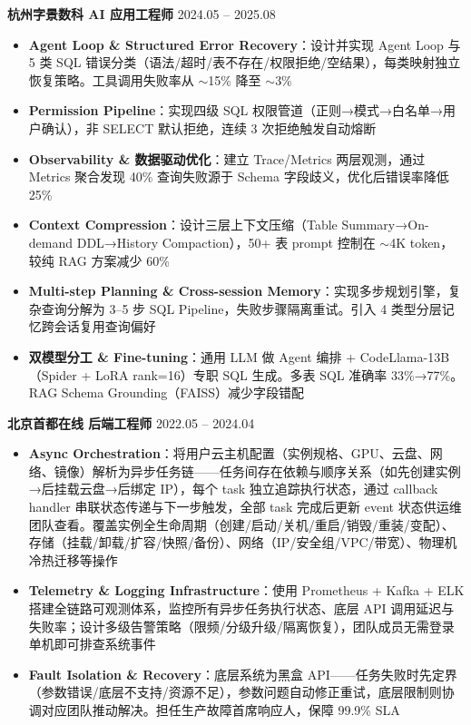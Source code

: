 \documentclass[10pt, a4paper]{article}
\newcommand{\entry}[2]{
  \vspace{0.35em}
  \noindent\textbf{#1} \hfill {\color{lightgray}\small #2}\newline
}
\begin{document}
\entry{杭州字景数科 \textbar{} AI 应用工程师}{2024.05 -- 2025.08}
\begin{itemize}
  \item \textbf{Agent Loop \& Structured Error Recovery}：设计并实现 Agent Loop 与 5 类 SQL 错误分类（语法/超时/表不存在/权限拒绝/空结果），每类映射独立恢复策略。工具调用失败率从 $\sim$15\% 降至 $\sim$3\%

  \item \textbf{Permission Pipeline}：实现四级 SQL 权限管道（正则→模式→白名单→用户确认），非 SELECT 默认拒绝，连续 3 次拒绝触发自动熔断

  \item \textbf{Observability \& 数据驱动优化}：建立 Trace/Metrics 两层观测，通过 Metrics 聚合发现 40\% 查询失败源于 Schema 字段歧义，优化后错误率降低 25\%

  \item \textbf{Context Compression}：设计三层上下文压缩（Table Summary→On-demand DDL→History Compaction），50+ 表 prompt 控制在 $\sim$4K token，较纯 RAG 方案减少 60\%

  \item \textbf{Multi-step Planning \& Cross-session Memory}：实现多步规划引擎，复杂查询分解为 3--5 步 SQL Pipeline，失败步骤隔离重试。引入 4 类型分层记忆跨会话复用查询偏好

  \item \textbf{双模型分工 \& Fine-tuning}：通用 LLM 做 Agent 编排 + CodeLlama-13B（Spider + LoRA rank=16）专职 SQL 生成。多表 SQL 准确率 33\%→77\%。RAG Schema Grounding（FAISS）减少字段错配
\end{itemize}

\entry{北京首都在线 \textbar{} 后端工程师}{2022.05 -- 2024.04}
\begin{itemize}
  \item \textbf{Async Orchestration}：将用户云主机配置（实例规格、GPU、云盘、网络、镜像）解析为异步任务链——任务间存在依赖与顺序关系（如先创建实例→后挂载云盘→后绑定 IP），每个 task 独立追踪执行状态，通过 callback handler 串联状态传递与下一步触发，全部 task 完成后更新 event 状态供运维团队查看。覆盖实例全生命周期（创建/启动/关机/重启/销毁/重装/变配）、存储（挂载/卸载/扩容/快照/备份）、网络（IP/安全组/VPC/带宽）、物理机冷热迁移等操作

  \item \textbf{Telemetry \& Logging Infrastructure}：使用 Prometheus + Kafka + ELK 搭建全链路可观测体系，监控所有异步任务执行状态、底层 API 调用延迟与失败率；设计多级告警策略（限频/分级升级/隔离恢复），团队成员无需登录单机即可排查系统事件

  \item \textbf{Fault Isolation \& Recovery}：底层系统为黑盒 API——任务失败时先定界（参数错误/底层不支持/资源不足），参数问题自动修正重试，底层限制则协调对应团队推动解决。担任生产故障首席响应人，保障 99.9\% SLA
\end{itemize}
\end{document}
